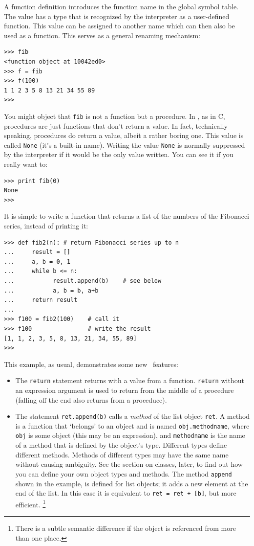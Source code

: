 A function definition introduces the function name in the global symbol
table.
The value has a type that is recognized by the interpreter as a
user-defined function.
This value can be assigned to another name which can then also be used
as a function.
This serves as a general renaming mechanism:
\bcode\begin{verbatim}
>>> fib
<function object at 10042ed0>
>>> f = fib
>>> f(100)
1 1 2 3 5 8 13 21 34 55 89
>>> 
\end{verbatim}\ecode
You might object that
{\tt fib}
is not a function but a procedure.
In \Python, as in C, procedures are just functions that don't return a
value.
In fact, technically speaking, procedures do return a value, albeit a
rather boring one.
This value is called {\tt None} (it's a built-in name).
Writing the value {\tt None} is normally suppressed by the interpreter
if it would be the only value written.
You can see it if you really want to:
\bcode\begin{verbatim}
>>> print fib(0)
None
>>> 
\end{verbatim}\ecode
It is simple to write a function that returns a list of the numbers of
the Fibonacci series, instead of printing it:
\bcode\begin{verbatim}
>>> def fib2(n): # return Fibonacci series up to n
...     result = []
...     a, b = 0, 1
...     while b <= n:
...           result.append(b)    # see below
...           a, b = b, a+b
...     return result
... 
>>> f100 = fib2(100)    # call it
>>> f100                # write the result
[1, 1, 2, 3, 5, 8, 13, 21, 34, 55, 89]
>>> 
\end{verbatim}\ecode
This example, as usual, demonstrates some new \Python\ features:
\begin{itemize}
\item
The
{\tt return}
statement returns with a value from a function.
{\tt return}
without an expression argument is used to return from the middle of a
procedure (falling off the end also returns from a proceduce).
\item
The statement
{\tt ret.append(b)}
calls a
{\em method}
of the list object
{\tt ret}.
A method is a function that `belongs' to an object and is named
{\tt obj.methodname},
where
{\tt obj}
is some object (this may be an expression), and
{\tt methodname}
is the name of a method that is defined by the object's type.
Different types define different methods.
Methods of different types may have the same name without causing
ambiguity.
See the section on classes, later, to find out how you can define your
own object types and methods.
The method
{\tt append}
shown in the example, is defined for list objects; it adds a new element
at the end of the list.
In this case it is equivalent to
{\tt ret = ret + [b]},
but more efficient.%
\footnote{
	There is a subtle semantic difference if the object
	is referenced from more than one place.
}
\end{itemize}
